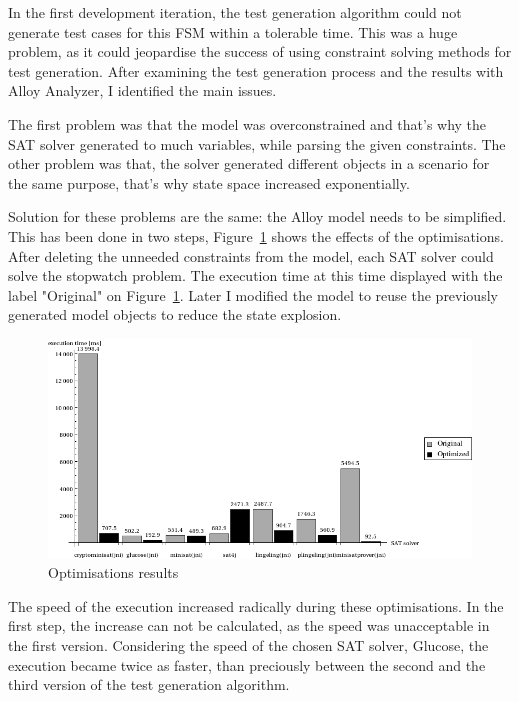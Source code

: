 In the first development iteration, the test generation algorithm could not generate test cases for this FSM within a tolerable time. This was a huge problem, as it could jeopardise the success of using constraint solving methods for test generation. After examining the test generation process and the results with Alloy Analyzer, I identified the main issues.

The first problem was that the model was overconstrained and that's why the SAT solver generated to much variables, while parsing the given constraints. The other problem was that, the solver generated different objects in a scenario for the same purpose, that's why state space increased exponentially.

Solution for these problems are the same: the Alloy model needs to be simplified. This has been done in two steps,  Figure~\ref{fig:measurements_optimalizations} shows the effects of the optimisations. After deleting the unneeded constraints from the model, each SAT solver could solve the stopwatch problem. The execution time at this time displayed with the label "Original" on Figure~\ref{fig:measurements_optimalizations}. Later I modified the model to reuse the previously generated model objects to reduce the state explosion.

\begin{figure}[htp]
\centering
\includegraphics[scale=0.55]{figures/measurements_optimalizations}
\caption{Optimisations results}
\label{fig:measurements_optimalizations}
\end{figure}

The speed of the execution increased radically during these optimisations. In the first step, the increase can not be calculated, as the speed was unacceptable in the first version. Considering the speed of the chosen SAT solver, Glucose, the execution became twice as faster, than preciously between the second and the third version of the test generation algorithm.

